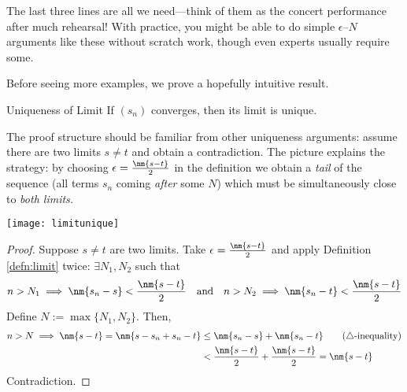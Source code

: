 
\goodbreak




The last three lines are all we need---think of them as the concert performance after much rehearsal! With practice, you might be able to do simple $\epsilon$--$N$ arguments like these without scratch work, though even experts usually require some.\smallbreak

Before seeing more examples, we prove a hopefully intuitive result.

\begin{lemm}{Uniqueness of Limit}{}
If $(s_n)$ converges, then its limit is unique.
\end{lemm}

The proof structure should be familiar from other uniqueness arguments: assume there are two limits $s\neq t$ and obtain a contradiction. The picture explains the strategy: by choosing $\epsilon=\frac{\nm{s-t}}2$ in the definition we obtain a \emph{tail} of the sequence (all terms $s_n$ coming \emph{after} some $N$) which must be simultaneously close to \emph{both limits.}
\begin{center}
\texttt{[image: limitunique]}
\end{center}

\begin{proof}
Suppose $s\neq t$ are two limits. Take $\epsilon=\frac{\nm{s-t}}2$ and apply Definition \ref{defn:limit} twice: $\exists N_1,N_2$ such that
\[n>N_1\implies \nm{s_n-s}<\frac{\nm{s-t}}2\quad \text{and}\quad n>N_2\implies \nm{s_n-t}<\frac{\nm{s-t}}2\]
Define $N:=\max\{N_1,N_2\}$. Then,
\begin{align*}
n>N\implies\nm{s-t}=\nm{s-s_n+s_n-t}&\le\nm{s_n-s}+\nm{s_n-t} \tag*{($\triangle$-inequality)}\\
&<\frac{\nm{s-t}}2+\frac{\nm{s-t}}2 =\nm{s-t}
\end{align*}
Contradiction.
\end{proof}


